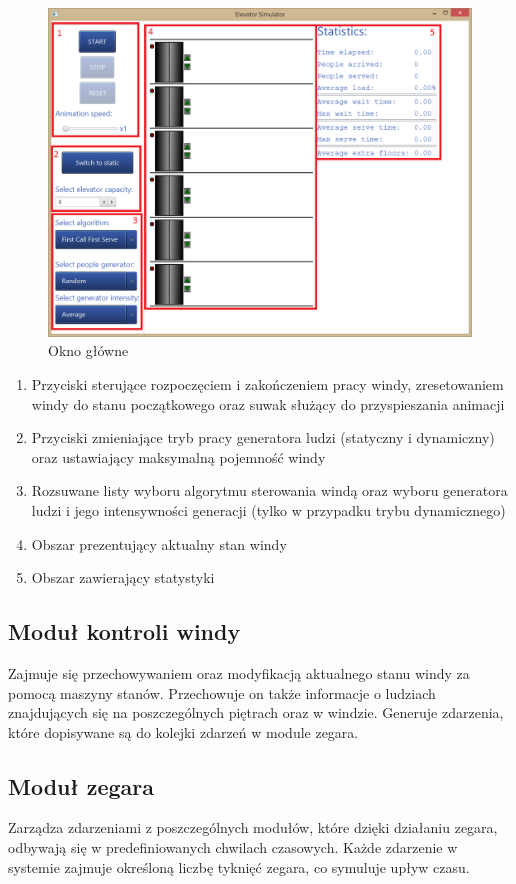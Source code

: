 \documentclass[a4paper,11pt]{article}
\begin{document}
\begin{figure}[H]
    \centering
    \caption{Okno główne}
    \includegraphics[width=\textwidth]{okno.png}
\end{figure}

\begin{enumerate}
	\item Przyciski sterujące rozpoczęciem i zakończeniem pracy windy, zresetowaniem windy do stanu początkowego oraz suwak służący do przyspieszania animacji
	\item Przyciski zmieniające tryb pracy generatora ludzi (statyczny i dynamiczny) oraz ustawiający maksymalną pojemność windy
	\item Rozsuwane listy wyboru algorytmu sterowania windą oraz wyboru generatora ludzi i jego intensywności generacji (tylko w przypadku trybu dynamicznego)
	\item Obszar prezentujący aktualny stan windy
	\item Obszar zawierający statystyki
\end{enumerate}
\subsection{Moduł kontroli windy}
Zajmuje się przechowywaniem oraz modyfikacją aktualnego stanu windy za pomocą maszyny stanów. Przechowuje on także informacje o ludziach znajdujących się na poszczególnych piętrach oraz w windzie.  Generuje zdarzenia, które dopisywane są do kolejki zdarzeń w module zegara.
\subsection{Moduł zegara}
Zarządza zdarzeniami z poszczególnych modułów, które dzięki działaniu zegara, odbywają się w predefiniowanych chwilach czasowych. Każde zdarzenie w systemie zajmuje określoną liczbę tyknięć zegara, co symuluje upływ czasu.
\end{document}
